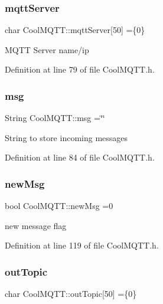 \subsubsection{\texorpdfstring{mqtt\+Server}{mqttServer}}
{\footnotesize\ttfamily char Cool\+M\+Q\+T\+T\+::mqtt\+Server\mbox{[}50\mbox{]} =\{\textquotesingle{}0\textquotesingle{}\}\hspace{0.3cm}{\ttfamily [private]}}

M\+Q\+TT Server name/ip 

Definition at line 79 of file Cool\+M\+Q\+T\+T.\+h.

\mbox{\label{class_cool_m_q_t_t_af6b19e7074dbbb4ae493c44dcb53f7ff}} 
\subsubsection{\texorpdfstring{msg}{msg}}
{\footnotesize\ttfamily String Cool\+M\+Q\+T\+T\+::msg =\char`\"{}\char`\"{}\hspace{0.3cm}{\ttfamily [private]}}

String to store incoming messages 

Definition at line 84 of file Cool\+M\+Q\+T\+T.\+h.

\mbox{\label{class_cool_m_q_t_t_a3240388137b885775aadf38e96b24c6b}} 
\subsubsection{\texorpdfstring{new\+Msg}{newMsg}}
{\footnotesize\ttfamily bool Cool\+M\+Q\+T\+T\+::new\+Msg =0\hspace{0.3cm}{\ttfamily [private]}}

new message flag 

Definition at line 119 of file Cool\+M\+Q\+T\+T.\+h.

\mbox{\label{class_cool_m_q_t_t_a109c786a17b463f9eeba046194279522}} 
\subsubsection{\texorpdfstring{out\+Topic}{outTopic}}
{\footnotesize\ttfamily char Cool\+M\+Q\+T\+T\+::out\+Topic\mbox{[}50\mbox{]} =\{\textquotesingle{}0\textquotesingle{}\}\hspace{0.3cm}{\ttfamily [private]}}

